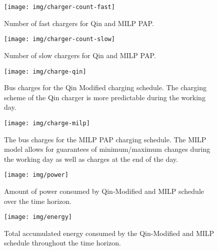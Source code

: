 \documentclass[utf8]{FrontiersinHarvard}
\begin{document}
\begin{subfigures}
    \begin{figure}[htpb]
    \centering
        \texttt{[image: img/charger-count-fast]}
        \caption{Number of fast chargers for Qin and MILP PAP.}
        \label{subfig:fast-charger-usage}
    \end{figure}

    \hfill

    \begin{figure}[!ht]
    \centering
        \texttt{[image: img/charger-count-slow]}
        \caption{Number of slow chargers for Qin and MILP PAP.}
        \label{subfig:slow-charger-usage}
    \end{figure}
\end{subfigures}

\begin{subfigures}
    \begin{figure}[htpb]
    \centering
        \texttt{[image: img/charge-qin]}
        \caption{Bus charges for the Qin Modified charging schedule. The charging scheme of the Qin charger is more predictable during the working day.}
        \label{subfig:qin-charge}
    \end{figure}

    \hfill

    \begin{figure}[htpb]
    \centering
        \texttt{[image: img/charge-milp]}
        \caption{The bus charges for the MILP PAP charging schedule. The MILP model allows for guarantees of minimum/maximum changes during the working day as well as charges at the end of the day.}
        \label{subfig:milp-charge}
    \end{figure}
\end{subfigures}

\begin{figure}[htpb]
\centering
    \texttt{[image: img/power]}
    \caption{Amount of power consumed by Qin-Modified and MILP schedule over the time horizon.}
    \label{fig:power-usage}
\end{figure}

\begin{figure}[htpb]
\centering
    \texttt{[image: img/energy]}
    \caption{Total accumulated energy consumed by the Qin-Modified and MILP schedule throughout the time horizon.}
    \label{fig:energy-usage}
\end{figure}
\end{document}
